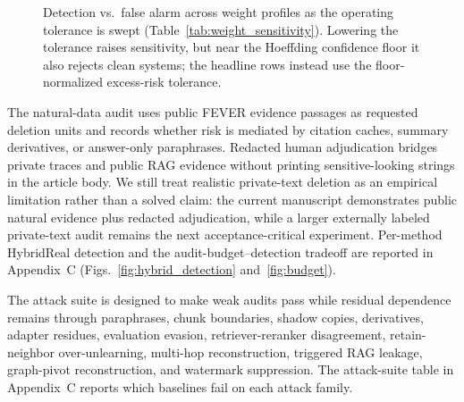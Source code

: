 \documentclass[10pt,journal,compsoc]{IEEEtran}
\begin{document}
\begin{figure}[t]
\centering
{}
\caption{Detection vs.\ false alarm across weight profiles as the operating tolerance is swept (Table~\ref{tab:weight_sensitivity}). Lowering the tolerance raises sensitivity, but near the Hoeffding confidence floor it also rejects clean systems; the headline rows instead use the floor-normalized excess-risk tolerance.}
\label{fig:tolerance_roc}
\end{figure}

The natural-data audit uses public FEVER evidence passages as requested deletion units and records whether risk is mediated by citation caches, summary derivatives, or answer-only paraphrases. Redacted human adjudication bridges private traces and public RAG evidence without printing sensitive-looking strings in the article body. We still treat realistic private-text deletion as an empirical limitation rather than a solved claim: the current manuscript demonstrates public natural evidence plus redacted adjudication, while a larger externally labeled private-text audit remains the next acceptance-critical experiment. Per-method HybridReal detection and the audit-budget--detection tradeoff are reported in Appendix~C (Figs.~\ref{fig:hybrid_detection} and~\ref{fig:budget}).

The attack suite is designed to make weak audits pass while residual dependence remains through paraphrases, chunk boundaries, shadow copies, derivatives, adapter residues, evaluation evasion, retriever-reranker disagreement, retain-neighbor over-unlearning, multi-hop reconstruction, triggered RAG leakage, graph-pivot reconstruction, and watermark suppression. The attack-suite table in Appendix~C reports which baselines fail on each attack family.
\end{document}
